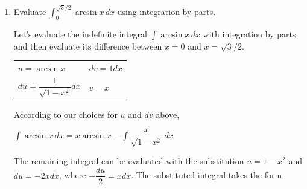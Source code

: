 \documentclass{article}
\begin{document}
\begin{enumerate}
\begin{enumerate}
\begin{solution}
\begin{center}
     \end{center}
     This rectangle's height is $\Delta y$, and its width is (right
     $x$-value) $-$ (left $x$-value).  The right $x$-value is
     $\frac{\sqrt{3}}{2}$; since $y = \arcsin x$ can be rewritten as $x =
     \sin y$, the left $x$-value is $\sin (y_k)$.  Therefore,
     \[ \text{area of $k$-th slice} \approx \left( \frac{\sqrt{3}}{2} -
       \sin y_k \right) \Delta y.\] Summing the areas of all the slices and
     taking the limit as the number of slices $\to \infty$, the area of the
     region is 
     \begin{align*}
       \int_0^{\pi/3} \left( \frac{\sqrt{3}}{2} - \sin y \right) dy &=
       \left. \frac{\sqrt{3}}{2} y + \cos y \right|_0^{\pi/3} \\
       &= \left( \frac{\sqrt{3}}{2} \cdot \frac{\pi}{3} + \frac{1}{2}
       \right) - (0 + 1) \\
       &= \boxed{\frac{\pi \sqrt{3}}{6} - \frac{1}{2}}
     \end{align*}
   \end{solution}
   \pspace{\newpage}
    \item Evaluate $\displaystyle \int_0^{\sqrt{3}/2} \arcsin x\,dx$ using integration by parts. 
    
        \begin{solution}
            Let's evaluate the indefinite integral $\displaystyle \int \arcsin x\,dx$ with integration by parts and then evaluate its difference between $x=0$ and $x=\sqrt{3}/2$.
\begin{center}
    \begin{tabular}{ l l }
  $u=\arcsin x$ &  $dv = 1 dx$  \\
  $du=\dfrac{1}{\sqrt{1-x^2}}dx$ &  $v=x$  \\
\end{tabular}
\end{center}

According to our choices for $u$ and $dv$ above,

\begin{center}
$\displaystyle \int \arcsin x\,dx = x\arcsin x - \displaystyle \int \dfrac{x}{\sqrt{1-x^2}} \,dx$
\end{center}

The remaining integral can be evaluated with the substitution $u=1-x^2$ and $du=-2xdx$, where $-\dfrac{du}{2}=xdx$. The substituted integral takes the form


\end{solution}
\end{enumerate}
\end{enumerate}
\end{document}
